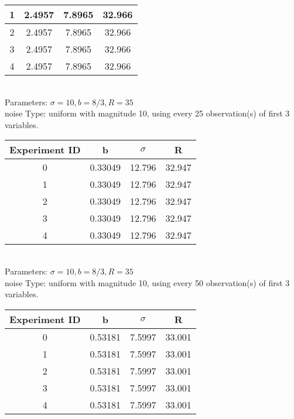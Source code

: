\begin{multicols}{3}
\begin{tabular}{cccc}
 1 & 2.4957 & 7.8965 & 32.966\\ \hline 
 2 & 2.4957 & 7.8965 & 32.966\\ \hline 
 3 & 2.4957 & 7.8965 & 32.966\\ \hline 
 4 & 2.4957 & 7.8965 & 32.966\\ \hline 
 \end{tabular}\\
Parameters: $\sigma=10, b=8/3, R=35$\\
noise Type: uniform with magnitude 10, using every 25 observation(s) of first 3 variables.\\
\begin{tabular}{cccc}
\hline Experiment ID & b & $\sigma$ & R \\ \hline 
0 & 0.33049 & 12.796 & 32.947\\ \hline 
 1 & 0.33049 & 12.796 & 32.947\\ \hline 
 2 & 0.33049 & 12.796 & 32.947\\ \hline 
 3 & 0.33049 & 12.796 & 32.947\\ \hline 
 4 & 0.33049 & 12.796 & 32.947\\ \hline 
 \end{tabular}\\
Parameters: $\sigma=10, b=8/3, R=35$\\
noise Type: uniform with magnitude 10, using every 50 observation(s) of first 3 variables.\\
\begin{tabular}{cccc}
\hline Experiment ID & b & $\sigma$ & R \\ \hline 
0 & 0.53181 & 7.5997 & 33.001\\ \hline 
 1 & 0.53181 & 7.5997 & 33.001\\ \hline 
 2 & 0.53181 & 7.5997 & 33.001\\ \hline 
 3 & 0.53181 & 7.5997 & 33.001\\ \hline 
 4 & 0.53181 & 7.5997 & 33.001\\ \hline 
 \end{tabular}\\

\end{multicols}
